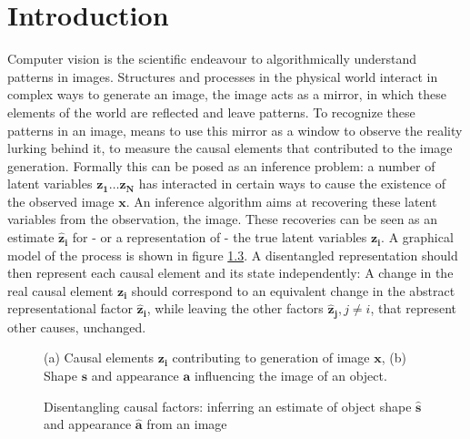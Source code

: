 \chapter{Introduction}

	Computer vision is the scientific endeavour to algorithmically understand patterns in images. Structures and processes in the physical world interact in complex ways to generate an image, the image acts as a mirror, in which these elements of the world are reflected and leave patterns.
	To recognize these patterns in an image, means to use this mirror as a window to observe the reality lurking behind it, \ie to measure the causal elements that contributed to the image generation.
	Formally this can be posed as an inference problem: a number of latent variables $\mathbf{z_1}\ldots\mathbf{z_N}$ has interacted in certain ways to cause the existence of the observed image $\mathbf{x}$. An inference algorithm aims at recovering these latent variables from the observation, \ie the image. These recoveries can be seen as an estimate $\mathbf{\hat z_i}$ for - or a representation of - the true latent variables $\mathbf{z_i}$. A graphical model of the process is shown in figure \ref{fig:causal}.
	A disentangled representation should then represent each causal element and its state independently: A change in the real causal element $\mathbf{z_i}$ should correspond to an equivalent change in the abstract representational factor $\mathbf{\hat z_i}$, while leaving the other factors $\mathbf{\hat z_j}, j\neq i$, that represent other causes, unchanged.

	\begin{figure}[t]
		\begin{subfigure}{0.49\linewidth}
			\centering
			
			\caption{}
			\label{fig:s1}
		\end{subfigure}
		\begin{subfigure}{0.49\linewidth}
			\centering
			
			\caption{}
			\label{fig:s2}
		\end{subfigure}
		\caption{(a) Causal elements $\mathbf{z_i}$ contributing to generation of image $\mathbf{x}$, (b) Shape $\mathbf{s}$ and appearance $\mathbf{a}$ influencing the image of an object.}
		\label{fig:causal}
	\end{figure}

	\begin{figure}[t]
		\centering
		
		\caption{Disentangling causal factors: \eg inferring an estimate of object shape $\mathbf{\hat s}$ and appearance $\mathbf{\hat a}$ from an image}
		\label{fig:infer}
	\end{figure}

